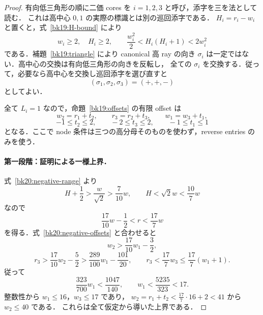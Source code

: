 \begin{proof}
有向低三角形の順に二価 cores を $i=1,2,3$ と呼び，添字を三を法として読む．
これは高中心 $0,1$ の実際の標識とは別の巡回添字である．
$H_i=r_i-w_i$ と置くと，式~\eqref{bk19:H-bound} により
\begin{equation}\label{bk20:negative-range}
 w_i\ge2,\quad H_i\ge2,\qquad
 \frac{w_i^2}{2}<H_i(H_i+1)<2w_i^2
\end{equation}
である．補題~\ref{bk19:triangle} により canonical 高 ray の向き
$\sigma_i$ は一定ではない．高中心の交換は有向低三角形の向きを反転し，
全ての $\sigma_i$ を交換する．従って，必要なら高中心を交換し巡回添字を選び直すと
\[
 (\sigma_1,\sigma_2,\sigma_3)=(+,+,-)
\]
としてよい．

全て $L_i=1$ なので，命題~\ref{bk19:offsets} の有限 offset は
\begin{equation}\label{bk20:negative-offsets}
 w_2=r_1+t_2,\qquad r_3=r_2+t_3,\qquad w_1=w_3+t_1,
\end{equation}
\[
 -1\le t_2\le2,\qquad -2\le t_3\le2,\qquad -1\le t_1\le1
\]
となる．ここで node 条件は三つの高分母そのものを使わず，reverse entries のみを使う．

\paragraph{第一段階：証明による一様上界．}
式~\eqref{bk20:negative-range} より
\[
 H+\frac12>\frac{w}{\sqrt2}>\frac7{10}w,
 \qquad H<\sqrt2w<\frac{10}{7}w
\]
なので
\begin{equation}\label{bk20:r-bounds}
 \frac{17}{10}w-\frac12<r<\frac{17}{7}w
\end{equation}
を得る．式~\eqref{bk20:negative-offsets} と合わせると
\[
 w_2>\frac{17}{10}w_1-\frac32,
\]
\[
 r_3>\frac{17}{10}w_2-\frac52
      >\frac{289}{100}w_1-\frac{101}{20},
 \qquad
 r_3<\frac{17}{7}w_3\le\frac{17}{7}(w_1+1).
\]
従って
\begin{equation}\label{bk20:proved-bound}
 \frac{323}{700}w_1<\frac{1047}{140},\qquad
 w_1<\frac{5235}{323}<17.
\end{equation}
整数性から $w_1\le16$，$w_3\le17$ であり，
$w_2=r_1+t_2<\frac{17}{7}\cdot16+2<41$ から $w_2\le40$ である．
これらは全て仮定から導いた上界である．


\end{proof}
